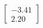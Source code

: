 \documentclass[preview]{standalone}
\begin{document}
\begin{align*}
\begin{bmatrix} -3.41 \\ 2.20 \end{bmatrix}
\end{align*}
\end{document}
